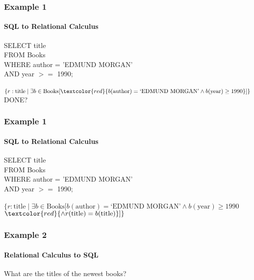 \documentclass{beamer}
\begin{document}
\begin{frame}
  \frametitle{Example 1}
    \framesubtitle{SQL to Relational Calculus}
  SELECT title\\
  FROM Books\\
  WHERE author = 'EDMUND MORGAN'\\
  AND year $>=$ 1990;\\
  \hfill \\
  $\{r:\text{title} \mid \exists b \in \text{Books} [ \textcolor{red}{b(\text{author}) = \text{`EDMUND MORGAN'} \land b(\text{year}) \geq 1990} ] \}$\\
  DONE?
\end{frame}

\begin{frame}
  \frametitle{Example 1}
    \framesubtitle{SQL to Relational Calculus}
  SELECT title\\
  FROM Books\\
  WHERE author = 'EDMUND MORGAN'\\
  AND year $>=$ 1990;\\
  \hfill \\
  $\{r:\text{title} \mid \exists b \in \text{Books} [ b(\text{author}) = \text{`EDMUND MORGAN'} \land b(\text{year}) \geq 1990$\\
  $\textcolor{red}{\land r(\text{title}) = b(\text{title})}] \}$\\
\end{frame}

\begin{frame}
  \frametitle{Example 2}
    \framesubtitle{Relational Calculus to SQL}
  What are the titles of the newest books?\\
\end{frame}
\end{document}
